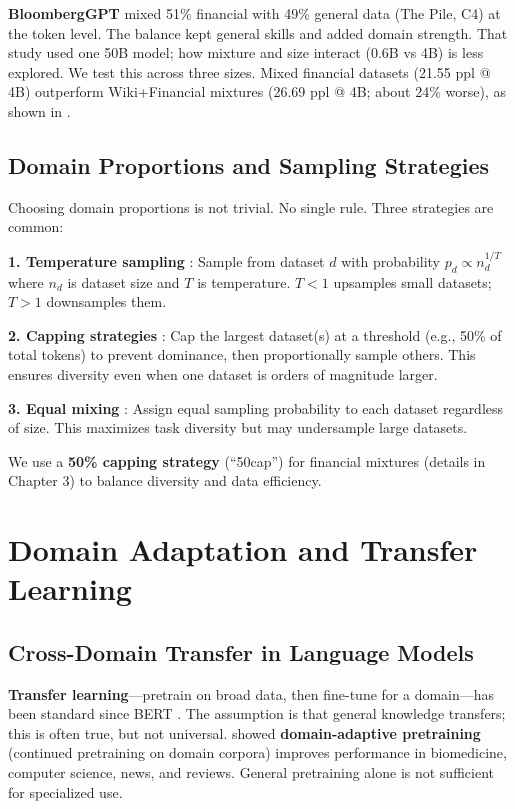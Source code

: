 \textbf{BloombergGPT} \parencite{wu2023bloomberggpt} mixed 51\% financial with 49\% general data (The Pile, C4) at the token level. The balance kept general skills and added domain strength. That study used one 50B model; how mixture and size interact (0.6B vs 4B) is less explored. We test this across three sizes. Mixed financial datasets (21.55 ppl @ 4B) outperform Wiki+Financial mixtures (26.69 ppl @ 4B; about 24\% worse), as shown in .

\subsection{Domain Proportions and Sampling Strategies}

Choosing domain proportions is not trivial. No single rule. Three strategies are common:

\textbf{1. Temperature sampling} \parencite{arivazhagan2019massively}: Sample from dataset $d$ with probability $p_d \propto n_d^{1/T}$ where $n_d$ is dataset size and $T$ is temperature. $T < 1$ upsamples small datasets; $T > 1$ downsamples them.

\textbf{2. Capping strategies} \parencite{longpre2023pretrainer}: Cap the largest dataset(s) at a threshold (e.g., 50\% of total tokens) to prevent dominance, then proportionally sample others. This ensures diversity even when one dataset is orders of magnitude larger.

\textbf{3. Equal mixing} \parencite{sanh2022multitask}: Assign equal sampling probability to each dataset regardless of size. This maximizes task diversity but may undersample large datasets.

We use a \textbf{50\% capping strategy} (``50cap'') for financial mixtures (details in Chapter 3) to balance diversity and data efficiency.

\section{Domain Adaptation and Transfer Learning}

\subsection{Cross-Domain Transfer in Language Models}

\textbf{Transfer learning}—pretrain on broad data, then fine-tune for a domain—has been standard since BERT \parencite{devlin2019bert,pan2010transfer,zhuang2020comprehensive}. The assumption is that general knowledge transfers; this is often true, but not universal. \textcite{gururangan2020don} showed \textbf{domain-adaptive pretraining} (continued pretraining on domain corpora) improves performance in biomedicine, computer science, news, and reviews. General pretraining alone is not sufficient for specialized use.

